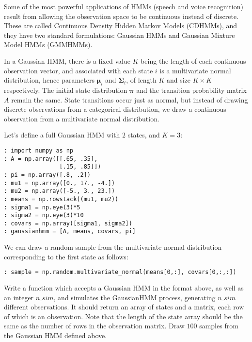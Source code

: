 
Some of the most powerful applications of HMMs (speech and voice recognition) result from allowing the observation space to be continuous instead of discrete.  These are called Continuous Density Hidden Markov Models (CDHMMs), and they have two standard formulations: Gaussian HMMs and Gaussian Mixture Model HMMs (GMMHMMs).

In a Gaussian HMM, there is a fixed value $K$ being the length of each continuous observation vector, and associated with each state $i$ is a multivariate normal distribution, hence parameters $\mathbf{\mu}_{i}$ and $\mathbf{\Sigma}_{i}$, of length $K$ and size $K \times K$ respectively. The initial state distribution $\mathbf{\pi}$ and the transition probability matrix $A$ remain the same. State transitions occur just as normal, but instead of drawing discrete observations from a categorical distribution, we draw a continuous observation from a multivariate normal distribution.

Let's define a full Gaussian HMM with $2$ states, and $K=3$:
\begin{lstlisting}
: import numpy as np
: A = np.array([[.65, .35],
                [.15, .85]])
: pi = np.array([.8, .2])
: mu1 = np.array([0., 17., -4.])
: mu2 = np.array([-5., 3., 23.])
: means = np.rowstack((mu1, mu2))
: sigma1 = np.eye(3)*5
: sigma2 = np.eye(3)*10
: covars = np.array([sigma1, sigma2])
: gaussianhmm = [A, means, covars, pi]
\end{lstlisting}
We can draw a random sample from the multivariate normal distribution corresponding to the first state as follows:

\begin{lstlisting}
: sample = np.random.multivariate_normal(means[0,:], covars[0,:,:])
\end{lstlisting}

\begin{problem}
Write a function which accepts a Gaussian HMM in the format above, as well as an integer $n\_sim$, and simulates the GaussianHMM process, generating $n\_sim$ different observations. It should return an array of states and a matrix, each row of which is an observation. Note that the length of the state array should be the same as the number of rows in the observation matrix. Draw $100$ samples from the Gaussian HMM defined above.
\end{problem}


